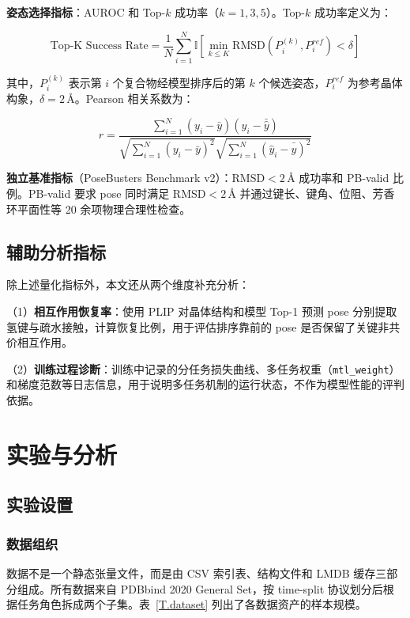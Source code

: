 \textbf{姿态选择指标}：AUROC 和 Top-$k$ 成功率（$k=1,3,5$）。Top-$k$ 成功率定义为：

\begin{equation}
 \text{Top-K Success Rate} = \frac{1}{N}\sum_{i=1}^{N}\mathbb{I}\left[\min_{k \leq K}\text{RMSD}(P_i^{(k)}, P_i^{ref}) < \delta\right]
\end{equation}

其中，$P_i^{(k)}$ 表示第 $i$ 个复合物经模型排序后的第 $k$ 个候选姿态，$P_i^{ref}$ 为参考晶体构象，$\delta = 2\,\text{\AA}$。Pearson 相关系数为：

\begin{equation}
 r = \frac{\sum_{i=1}^{N}(y_i - \bar{y})(\hat{y}_i - \bar{\hat{y}})}{\sqrt{\sum_{i=1}^{N}(y_i - \bar{y})^2}\sqrt{\sum_{i=1}^{N}(\hat{y}_i - \bar{\hat{y}})^2}}
\end{equation}

\textbf{独立基准指标}（PoseBusters Benchmark v2）：RMSD$<2$\,\AA{} 成功率和 PB-valid 比例。PB-valid 要求 pose 同时满足 RMSD$<2$\,\AA{} 并通过键长、键角、位阻、芳香环平面性等 20 余项物理合理性检查。

\subsection{辅助分析指标}

除上述量化指标外，本文还从两个维度补充分析：

（1）\textbf{相互作用恢复率}：使用 PLIP\cite{adasme2021plip} 对晶体结构和模型 Top-1 预测 pose 分别提取氢键与疏水接触，计算恢复比例，用于评估排序靠前的 pose 是否保留了关键非共价相互作用。

（2）\textbf{训练过程诊断}：训练中记录的分任务损失曲线、多任务权重（\texttt{mtl\_weight}）和梯度范数等日志信息，用于说明多任务机制的运行状态，不作为模型性能的评判依据。

\newpage

\section{实验与分析}
\subsection{实验设置}
\subsubsection{数据组织}

数据不是一个静态张量文件，而是由 CSV 索引表、结构文件和 LMDB 缓存三部分组成。所有数据来自 PDBbind 2020 General Set，按 time-split 协议划分后根据任务角色拆成两个子集。表~\ref{T.dataset} 列出了各数据资产的样本规模。

